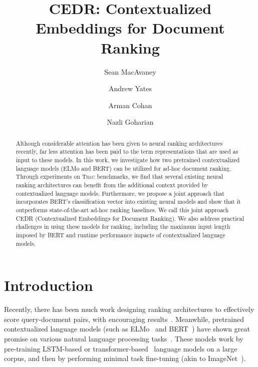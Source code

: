 \documentclass[sigconf]{acmart}
\begin{document}
\title[CEDR: Contextualized Embeddings for Document Ranking]{CEDR: Contextualized Embeddings for Document Ranking}

\author{Sean MacAvaney}

\author{Andrew Yates}

\author{Arman Cohan}

\author{Nazli Goharian}

\renewcommand{\shortauthors}{MacAvaney, et al.}

\begin{abstract}
Although considerable attention has been given to neural ranking architectures recently, far less attention has been paid to the term representations that are used as input to these models.
In this work, we investigate how two pretrained contextualized language models (ELMo and BERT) can be utilized for ad-hoc document ranking. Through experiments on \textsc{Trec} benchmarks, we find that several existing neural ranking architectures can benefit from the additional context provided by contextualized language models. Furthermore, we propose a joint approach that incorporates BERT's classification vector into existing neural models and show that it outperforms state-of-the-art ad-hoc ranking baselines. We call this joint approach CEDR (Contextualized Embeddings for Document Ranking). We also address practical challenges in using these models for ranking, including the maximum input length imposed by BERT and runtime performance impacts of contextualized language models.
\end{abstract}

\maketitle

\section{Introduction}
Recently, there has been much work designing ranking architectures to effectively score query-document pairs, with encouraging results~\cite{Guo2016ADR,Hui2018CoPACRRAC,Xiong2017EndtoEndNA}. Meanwhile, pretrained contextualized language models (such as ELMo~\cite{Peters:2018} and BERT~\cite{devlin2018bert}) have shown great promise on various natural language processing tasks~\cite{Peters:2018,devlin2018bert}. These models work by pre-training LSTM-based or transformer-based~\cite{Vaswani2017AttentionIA} language models on a large corpus, and then by performing minimal task fine-tuning (akin to ImageNet~\cite{deng2009imagenet,yosinski2014transferable}).
\end{document}
